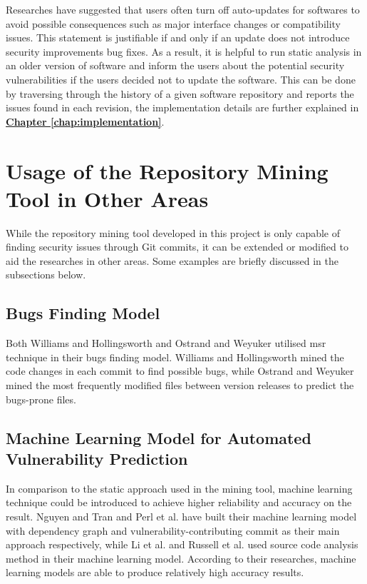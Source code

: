 \documentclass[12pt, a4paper]{report}
\begin{document}
Researches have suggested that users often turn off auto-updates for softwares \cite{fagan_2015,
mathur_2017} to avoid possible consequences such as major interface changes or compatibility issues.
This statement is justifiable if and only if an update does not introduce security improvements bug
fixes. As a result, it is helpful to run static analysis in an older version of software and inform
the users about the potential security vulnerabilities if the users decided not to update the
software. This can be done by traversing through the history of a given software repository and
reports the issues found in each revision, the implementation details are further explained in
\hyperref[chap:implementation]{\textbf{Chapter \ref*{chap:implementation}}}.

\section{Usage of the Repository Mining Tool in Other Areas}
While the repository mining tool developed in this project is only capable of finding security
issues through Git commits, it can be extended or modified to aid the researches in other areas.
Some examples are briefly discussed in the subsections below.

\subsection{Bugs Finding Model}
Both Williams and Hollingsworth \cite{williams_2005} and Ostrand and Weyuker \cite{ostrand_2004}
utilised \acrshort{msr} technique in their bugs finding model. Williams and Hollingsworth mined the
code changes in each commit to find possible bugs, while Ostrand and Weyuker mined the most
frequently modified files between version releases to predict the bugs-prone files.

\subsection{Machine Learning Model for Automated Vulnerability Prediction}
In comparison to the static approach used in the mining tool, machine learning technique could be
introduced to achieve higher reliability and accuracy on the result. Nguyen and Tran
\cite{nguyen_2010} and Perl et al. \cite{perl_2015} have built their machine learning model with
dependency graph and vulnerability-contributing commit as their main approach respectively, while Li
et al. \cite{li_2016} and Russell et al. \cite{russell_2018} used source code analysis method in
their machine learning model. According to their researches, machine learning models are able to
produce relatively high accuracy results.
\end{document}
